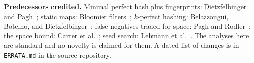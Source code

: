 \begin{center}
{\begin{minipage}{0.93\linewidth}
\textbf{Predecessors credited.} Minimal perfect hash plus fingerprints:
Dietzfelbinger and Pagh~\cite{dietzfelbinger2008}; static maps: Bloomier
filters~\cite{bloomier}; $k$-perfect hashing: Belazzougui, Botelho, and
Dietzfelbinger~\cite{chd}; false negatives traded for space: Pagh and
Rodler~\cite{pagh2001lossy}; the space bound: Carter et al.~\cite{carter1978};
seed search: Lehmann et al.~\cite{lehmann2025seeds}. The analyses here are
standard and no novelty is claimed for them.
A dated list of changes is in \texttt{ERRATA.md} in the source repository.
\end{minipage}}
\end{center}
\endgroup
